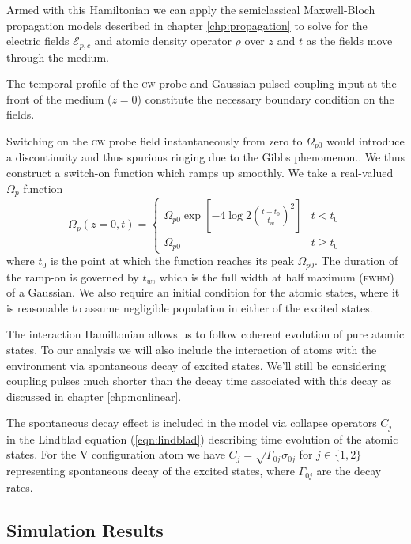     Armed with this Hamiltonian we can apply the semiclassical Maxwell-Bloch
    propagation models described in chapter \ref{chp:propagation} to solve for
    the electric fields $\mathcal{E}_{p,c}$ and atomic density operator $\rho$
    over $z$ and $t$ as the fields move through the medium.

    The temporal profile of the \textsc{cw} probe and Gaussian pulsed
    coupling input at the front of the medium ($z\!=\!0$) constitute the
    necessary boundary condition on the fields.

    Switching on the \textsc{cw} probe field instantaneously from zero to
    $\Omega_{p0}$ would introduce a discontinuity and thus spurious ringing due
    to the Gibbs phenomenon.\cite{Hewitt1979}. We thus construct a switch-on
    function which ramps up smoothly. We take a real-valued $\Omega_{p}$
    function
    \begin{equation}
      \Omega_p(z\!=\!0, t) = 
      \begin{cases}
        \Omega_{p0} \exp \left[ -4 \log 2 \left( \frac{t - t_0}{t_w}
        \right)^2 \right] & t < t_0\\
        \Omega_{p0} & t \ge t_0
      \end{cases}
    \end{equation}
    where $t_0$ is the point at which the function reaches its peak
    $\Omega_{p0}$. The duration of the ramp-on is governed by $t_w$, which is
    the full width at half maximum (\textsc{fwhm}) of a Gaussian. We also
    require an initial condition for the atomic states, where it is reasonable
    to assume negligible population in either of the excited states.

    The interaction Hamiltonian allows us to follow coherent evolution of pure
    atomic states. To our analysis we will also include the interaction of atoms
    with  the environment via spontaneous decay of excited states. We'll still
    be considering coupling pulses much shorter than the decay time associated
    with  this decay as discussed in chapter \ref{chp:nonlinear}.

    The spontaneous decay effect is included in the model via collapse operators
    $C_j$ in the Lindblad equation (\ref{eqn:lindblad}) describing time evolution
    of the atomic states. For the V configuration atom we have $C_{j}  =
    \sqrt{\Gamma_{0j}}\sigma_{0j}$ for $j \in \{1, 2\}$ representing spontaneous
    decay of the excited states, where $\Gamma_{0j}$ are the decay rates.

  \subsection{Simulation Results}


